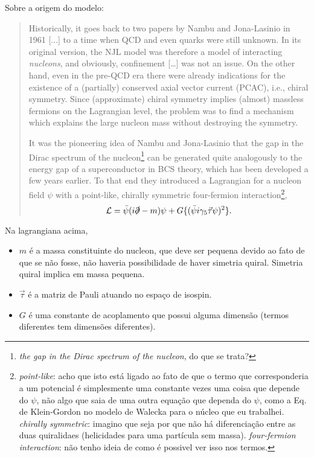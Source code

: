 Sobre a origem do modelo\cite{Buballa}:
\begin{quote}
Historically, it goes back to two papers by Nambu and Jona-Lasinio in 1961 [...] to a time when QCD and even quarks were still unknown. In its original version, the NJL model was therefore a model of interacting \emph{nucleons}, and obviously, confinement [\dots] was not an issue. On the other hand, even in the pre-QCD era there were already indications for the existence of a (partially) conserved axial vector current (PCAC), i.e., chiral symmetry. Since (approximate) chiral symmetry implies (almost) massless fermions on the Lagrangian level, the problem was to find a mechanism which explains the large nucleon mass without destroying the symmetry.

It was the pioneering idea of Nambu and Jona-Lasinio that the gap in the Dirac spectrum of the nucleon\footnote{\emph{the gap in the Dirac spectrum of the nucleon}, do que se trata?} can be generated quite analogously to the energy gap of a superconductor in BCS theory, which has been developed a few years earlier. To that end they introduced a Lagrangian for a nucleon field $\psi$ with a point-like, chirally symmetric four-fermion interaction\footnote{\emph{point-like}: acho que isto está ligado ao fato de que o termo que corresponderia a um potencial é simplesmente uma constante vezes uma coisa que depende do $\psi$, não algo que saia de uma outra equação que dependa do $\psi$, como a Eq. de Klein-Gordon no modelo de Walecka para o núcleo que eu trabalhei. \emph{chirally symmetric}: imagino que seja por que não há diferenciação entre as duas quiralidaes (helicidades para uma partícula sem massa). \emph{four-fermion interaction}: não tenho ideia de como é possivel ver isso nos termos.},
\begin{equation}\label{Eq:LagOriginalNJL}
	\mathcal{L} = \bar{\psi}(i\slashed{\partial} - m)\psi + G\{(\bar{\psi}i\gamma_5\vec{\tau}\psi)^2\}.
\end{equation}
\end{quote}
%
Na lagrangiana acima,
\begin{itemize}
	\item $m$ é a massa constituinte do nucleon, que deve ser pequena devido ao fato de que se não fosse, não haveria possibilidade de haver simetria quiral. Simetria quiral implica em massa pequena.
	\item $\vec{\tau}$ é a matriz de Pauli atuando no espaço de isospin.
	\item $G$ é uma constante de acoplamento que possui alguma dimensão (termos diferentes tem dimensões diferentes).
\end{itemize}

